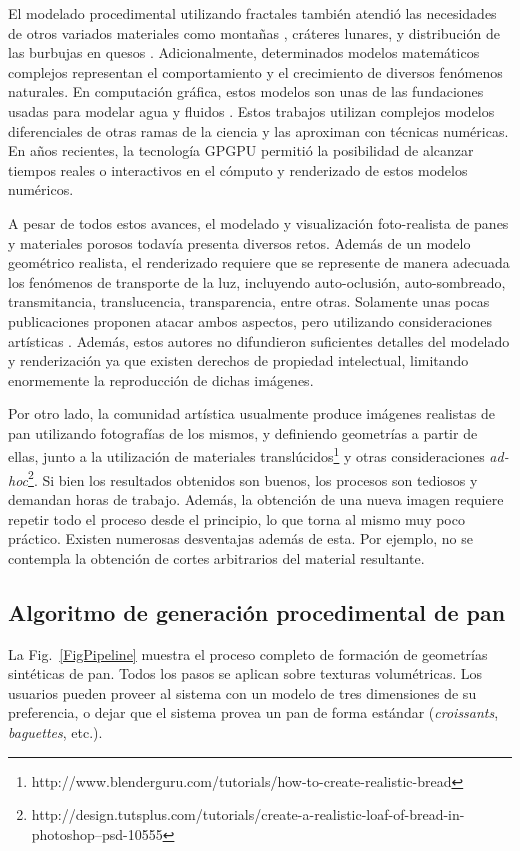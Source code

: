 El modelado procedimental utilizando fractales también atendió las necesidades de otros variados materiales como montañas \cite{Prusinkiewicz1993}, cráteres lunares, y distribución de las burbujas en quesos \cite{Mandelbrot1983}. 
Adicionalmente, determinados modelos matemáticos complejos representan el comportamiento y el crecimiento de diversos fenómenos naturales.
En computación gráfica, estos modelos son unas de las fundaciones usadas para modelar agua y fluidos \cite{Stam1999,Fedkiw2001}.
Estos trabajos utilizan complejos modelos diferenciales de otras ramas de la ciencia y las aproximan con técnicas numéricas.
En años recientes, la tecnología GPGPU \cite{Owens2007} permitió la posibilidad de alcanzar tiempos reales o interactivos en el cómputo y renderizado de estos modelos numéricos.

A pesar de todos estos avances, el modelado y visualización foto-realista de panes y materiales porosos todavía presenta diversos retos.
Además de un modelo geométrico realista, el renderizado requiere que se represente de manera adecuada los fenómenos de transporte de la luz, incluyendo auto-oclusión, auto-sombreado, transmitancia, translucencia, transparencia, entre otras.
Solamente unas pocas publicaciones proponen atacar ambos aspectos, pero utilizando consideraciones artísticas \cite{Xenakis2007}.
Además, estos autores no difundieron suficientes detalles del modelado y renderización ya que existen derechos de propiedad intelectual, limitando enormemente la reproducción de dichas imágenes.

Por otro lado, la comunidad artística usualmente produce imágenes realistas de pan utilizando fotografías de los mismos, y definiendo geometrías a partir de ellas, junto a la utilización de materiales translúcidos\footnote{http://www.blenderguru.com/tutorials/how-to-create-realistic-bread} y otras consideraciones {\em ad-hoc}\footnote{http://design.tutsplus.com/tutorials/create-a-realistic-loaf-of-bread-in-photoshop--psd-10555}.
Si bien los resultados obtenidos son buenos, los procesos son tediosos y demandan horas de trabajo.
Además, la obtención de una nueva imagen requiere repetir todo el proceso desde el principio, lo que torna al mismo muy poco práctico.
Existen numerosas desventajas además de esta.
Por ejemplo, no se contempla la obtención de cortes arbitrarios del material resultante.


\subsection{Algoritmo de generación procedimental de pan}
La Fig.~\ref{FigPipeline} muestra el proceso completo de formación de geometrías sintéticas de pan.
Todos los pasos se aplican sobre texturas volumétricas.
Los usuarios pueden proveer al sistema con un modelo de tres dimensiones de su preferencia, o dejar que el sistema provea un pan de forma estándar ({\em croissants}, {\em baguettes}, etc.).

